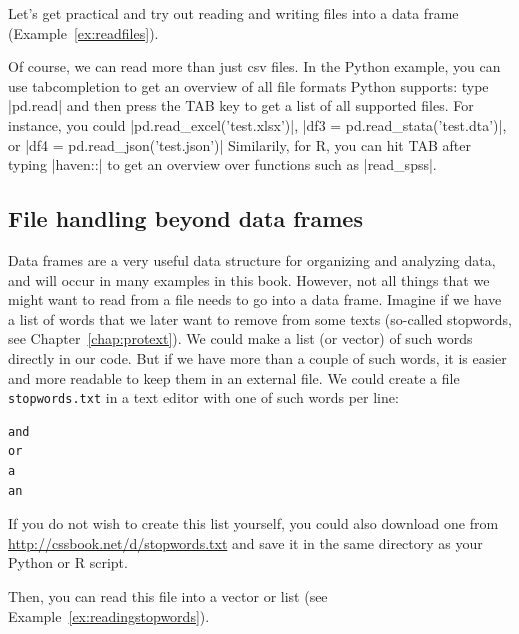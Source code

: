 Let's get practical and try out reading and writing files into a data frame (Example~\ref{ex:readfiles}).


Of course, we can read more than just csv files. In the Python
example, you can use tabcompletion to get an overview of all file
formats Python supports: type |pd.read| and then press the TAB key to
get a list of all supported files. For instance, you could 
|pd.read_excel('test.xlsx')|, |df3 = pd.read_stata('test.dta')|, or
|df4 = pd.read_json('test.json')| Similarily, for R, you can hit TAB
after typing |haven::| to get an overview over functions such as
|read_spss|.

\subsection{File handling beyond data frames}
Data frames are a very useful data structure for organizing and analyzing data, and will occur in many examples in this book.
However, not all things that we might want to read from a file needs to go into a data frame.
Imagine if we have a list of words that we later want to remove from some texts (so-called stopwords, see Chapter~\ref{chap:protext}).
We could make a list (or vector) of such words directly in our code.
But if we have more than a couple of such words, it is easier and more readable to keep them in an external file. We could create a file \texttt{stopwords.txt} in a text editor with one of such words per line:

\begin{lstlisting}
and
or
a
an
\end{lstlisting}

If you do not wish to create this list yourself, you could also
download one from \url{http://cssbook.net/d/stopwords.txt} and save it
in the same directory as your Python or R script.

Then, you can read this file into a vector or list  (see Example~\ref{ex:readingstopwords}).



